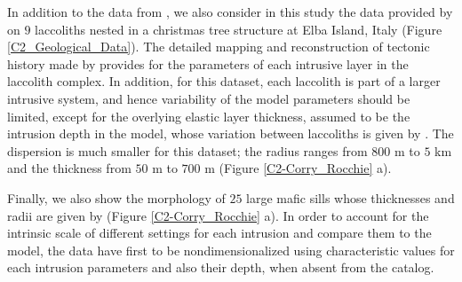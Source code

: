 In addition  to the  data from \citet{E:2015tl},  we also  consider in
this  study   the  data  provided  by   \citet{Rocchi:2002jy}  on  $9$
laccoliths nested in a christmas  tree structure at Elba Island, Italy
(Figure   \ref{C2_Geological_Data}).    The   detailed   mapping   and
reconstruction  of  tectonic  history  made  by  \citet{Rocchi:2002jy}
provides for the  parameters of each intrusive layer  in the laccolith
complex. In  addition, for this dataset,  each laccolith is part  of a
larger intrusive system, and hence variability of the model parameters
should be limited,  except for the overlying  elastic layer thickness,
assumed  to be  the  intrusion  depth in  the  model, whose  variation
between laccoliths is given  by \citet{Rocchi:2002jy}.  The dispersion
is much  smaller for this dataset;  the radius ranges from  $800$ m to
$5$  km   and  the  thickness   from  $50$   m  to  $700$   m  (Figure
\ref{C2-Corry_Rocchie} a).

Finally, we also  show the morphology of $25$ large  mafic sills whose
thicknesses  and   radii  are   given  by   \citet{Cruden:tg}  (Figure
\ref{C2-Corry_Rocchie}  a).  In  order  to account  for the  intrinsic
scale of different settings for each intrusion and compare them to the
model,   the  data   have   first  to   be  nondimensionalized   using
characteristic  values for  each intrusion  parameters and  also their
depth, when absent from the catalog.

